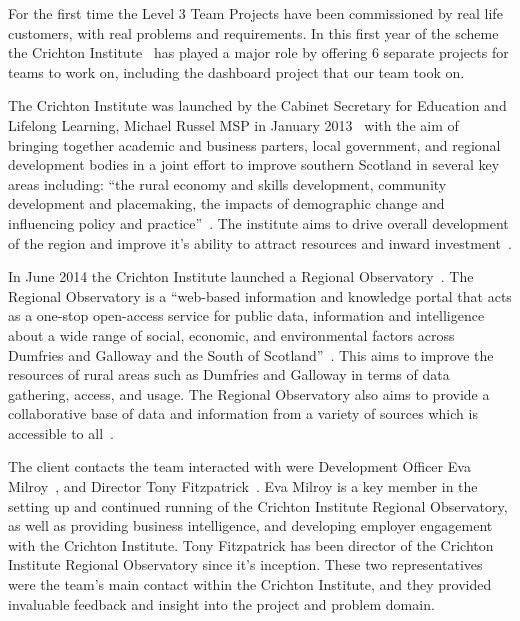 \documentclass{l3proj}
\begin{document}
For the first time the Level 3 Team Projects have been commissioned by real life customers, with real problems and requirements. In this first year of the scheme the Crichton Institute~\cite{CrichtonInstitute} has played a major role by offering 6 separate projects for teams to work on, including the dashboard project that our team took on.


The Crichton Institute was launched by the Cabinet Secretary for Education and Lifelong Learning, Michael Russel MSP in January 2013~\cite{CrichtonInsituteFounded} with the aim of bringing together academic and business parters, local government, and regional development bodies in a joint effort to improve southern Scotland in several key areas including: ``the rural economy and skills development, community development and placemaking, the impacts of demographic change and influencing policy and practice''~\cite{CrichtonInsituteCoreAims}. The institute aims to drive overall development of the region and improve it's ability to attract resources and inward investment~\cite{CrichtonInstituteAboutUs}.

In June 2014 the Crichton Institute launched a Regional Observatory~\cite{CrichtonInstituteRegionalObservatory}. The Regional Observatory is a ``web-based information and knowledge portal that acts as a one-stop open-access service for public data, information and intelligence about a wide range of social, economic, and environmental factors across Dumfries and Galloway and the South of Scotland''~\cite{ScotGovOpenDataResourcePack}. This aims to improve the resources of rural areas such as Dumfries and Galloway in terms of data gathering, access, and usage. The Regional Observatory also aims to provide a collaborative base of data and information from a variety of sources which is accessible to all~\cite{ScotGovOpenDataResourcePack}.

The client contacts the team interacted with were Development Officer Eva Milroy~\cite{EvaMilroyLinkedIn}, and Director Tony Fitzpatrick~\cite{TonyFitzpatrickLinkedIn}. Eva Milroy is a key member in the setting up and continued running of the Crichton Institute Regional Observatory, as well as providing business intelligence, and developing employer engagement with the Crichton Institute. Tony Fitzpatrick has been director of the Crichton Institute Regional Observatory since it's inception. These two representatives were the team's main contact within the Crichton Institute, and they provided invaluable feedback and insight into the project and problem domain.
\end{document}
